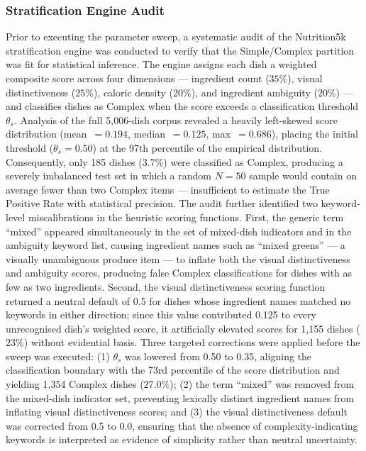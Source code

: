 \subsubsection{Stratification Engine Audit}
Prior to executing the parameter sweep, a systematic audit of the Nutrition5k stratification engine was conducted to verify that the Simple/Complex partition was fit for statistical inference. The engine assigns each dish a weighted composite score across four dimensions --- ingredient count ($35\%$), visual distinctiveness ($25\%$), caloric density ($20\%$), and ingredient ambiguity ($20\%$) --- and classifies dishes as Complex when the score exceeds a classification threshold $\theta_s$. Analysis of the full 5,006-dish corpus revealed a heavily left-skewed score distribution (mean~$= 0.194$, median~$= 0.125$, max~$= 0.686$), placing the initial threshold ($\theta_s = 0.50$) at the 97th percentile of the empirical distribution. Consequently, only 185 dishes ($3.7\%$) were classified as Complex, producing a severely imbalanced test set in which a random $N=50$ sample would contain on average fewer than two Complex items --- insufficient to estimate the True Positive Rate with statistical precision. The audit further identified two keyword-level miscalibrations in the heuristic scoring functions. First, the generic term ``mixed'' appeared simultaneously in the set of mixed-dish indicators and in the ambiguity keyword list, causing ingredient names such as ``mixed greens'' --- a visually unambiguous produce item --- to inflate both the visual distinctiveness and ambiguity scores, producing false Complex classifications for dishes with as few as two ingredients. Second, the visual distinctiveness scoring function returned a neutral default of 0.5 for dishes whose ingredient names matched no keywords in either direction; since this value contributed 0.125 to every unrecognised dish's weighted score, it artificially elevated scores for 1,155 dishes ($23\%$) without evidential basis. Three targeted corrections were applied before the sweep was executed: (1) $\theta_s$ was lowered from 0.50 to 0.35, aligning the classification boundary with the 73rd percentile of the score distribution and yielding 1,354 Complex dishes ($27.0\%$); (2) the term ``mixed'' was removed from the mixed-dish indicator set, preventing lexically distinct ingredient names from inflating visual distinctiveness scores; and (3) the visual distinctiveness default was corrected from 0.5 to 0.0, ensuring that the absence of complexity-indicating keywords is interpreted as evidence of simplicity rather than neutral uncertainty.

